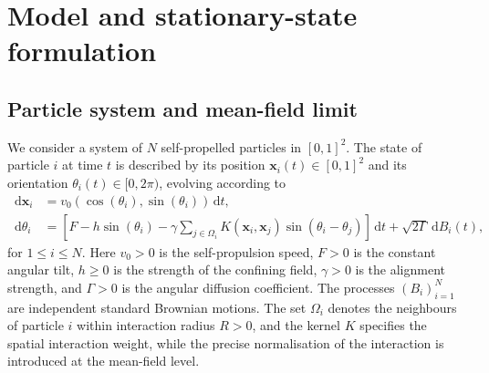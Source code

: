 \documentclass[a4paper,11pt]{article}
\theoremstyle{plain}
\theoremstyle{definition}
\theoremstyle{remark}
\newcommand{\dd}{\,\mathrm{d}}
\newcommand{\bx}{\mathbf{x}}
\begin{document}
\section{Model and stationary-state formulation}\label{sec:model}
\subsection{Particle system and mean-field limit}\label{subsec:particle}
We consider a system of $N$ self-propelled particles in $[0,1]^2$. The state of particle $i$ at time $t$ is described by its position $\bx_i(t)\in [0,1]^2$ and its orientation $\theta_i(t)\in[0,2\pi)$, evolving according to
\begin{align}
    \dd \bx_i &= v_0 (\cos(\theta_i),\sin(\theta_i)) \dd t, \label{eq:sde-x}\\
    \dd \theta_i &= \left[F-h\sin(\theta_i)-\gamma\sum_{j\in\Omega_i}K(\bx_i,\bx_j)\sin(\theta_i-\theta_j)\right]\dd t+\sqrt{2\Gamma} \dd B_i(t), \label{eq:sde-theta}
\end{align}
for $1\leq i\leq N$. Here $v_0>0$ is the self-propulsion speed, $F>0$ is the constant angular tilt, $h\geq 0$ is the strength of the confining field, $\gamma>0$ is the alignment strength, and $\Gamma>0$ is the angular diffusion coefficient. The processes $(B_i)_{i=1}^N$ are independent standard Brownian motions. The set $\Omega_i$ denotes the neighbours of particle $i$ within interaction radius $R>0$, and the kernel $K$ specifies the spatial interaction weight, while the precise normalisation of the interaction is introduced at the mean-field level.
\end{document}
